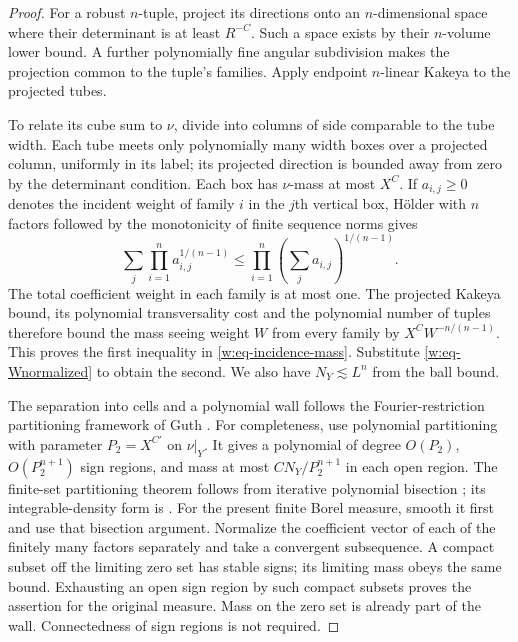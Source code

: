 \begin{proof}
For a robust $n$-tuple, project its directions onto an $n$-dimensional
space where their determinant is at least $R^{-C}$.  Such a space
exists by their $n$-volume lower bound.  A further polynomially fine
angular subdivision makes the projection common to the tuple's
families.  Apply endpoint $n$-linear Kakeya to the projected tubes.

To relate its cube sum to $\nu$, divide into columns of side comparable
to the tube width.  Each tube meets only polynomially many width boxes
over a projected column, uniformly in its label; its projected
direction is bounded away from zero by the determinant condition.
Each box has $\nu$-mass at most $X^C$.  If $a_{i,j}\geq0$ denotes the
incident weight of family $i$ in the $j$th vertical box, H\"older with
$n$ factors followed by the monotonicity of finite sequence norms gives
\[
 \sum_j\prod_{i=1}^n a_{i,j}^{1/(n-1)}
 \leq\prod_{i=1}^n\left(\sum_j a_{i,j}\right)^{1/(n-1)}.
\]
The total coefficient weight in each family is at most one.  The
projected Kakeya bound, its polynomial transversality cost and the
polynomial number of tuples therefore bound the mass seeing weight
$W$ from every family by $X^CW^{-n/(n-1)}$.  This proves the first
inequality in \eqref{w:eq-incidence-mass}.  Substitute
\eqref{w:eq-Wnormalized} to obtain the second.  We also have
$N_Y\lesssim L^n$ from the ball bound.

The separation into cells and a polynomial wall follows the
Fourier-restriction partitioning framework of
Guth \citep[Sections~3.2--3.4]{Guth2016Restriction}.
For completeness, use polynomial partitioning with parameter
$P_2=X^{C'}$ on $\nu|_Y$.  It gives a polynomial of degree $O(P_2)$,
$O(P_2^{n+1})$ sign regions, and mass at most
$CN_Y/P_2^{n+1}$ in each open region.  The finite-set partitioning
theorem follows from iterative polynomial bisection
\citep[Theorem~4.1]{GuthKatz2015}; its integrable-density form is
\citet[Theorem~1.4]{Guth2016Restriction}.  For the present finite Borel
measure, smooth it first and use that bisection argument.  Normalize the
coefficient vector of each of the finitely many factors separately
and take a convergent subsequence.  A compact subset off the limiting
zero set has stable signs; its limiting mass obeys the same bound.
Exhausting an open sign region by such compact subsets proves the
assertion for the original measure.  Mass on the zero set is already
part of the wall.  Connectedness of sign regions is not required.


\end{proof}
